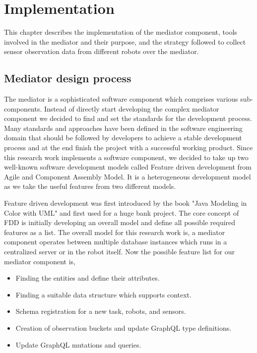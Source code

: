 

	\let\cleardoublepage\clearpage
\chapter{Implementation} \label{sec:implementation}
This chapter describes the implementation of the mediator component, tools involved in the mediator and their purpose, and the strategy followed to collect sensor observation data from different robots over the mediator. 

	\section{Mediator design process}
	 The mediator is a sophisticated software component which comprises various sub-components. Instead of directly start developing the complex mediator component we decided to find and set the standards for the development process. Many standards and approaches have been defined in the software engineering domain that should be followed by developers to achieve a stable development process and at the end finish the project with a successful working product. Since this research work implements a software component, we decided to take up two well-known software development models called Feature driven development from Agile and Component Assembly Model. It is a heterogeneous development model as we take the useful features from two different models.
	
	Feature driven development was first introduced by the book "Java Modeling in Color with UML" \cite{misc15} and first used for a huge bank project. The core concept of FDD is initially developing an overall model and define all possible required features as a list. The overall model for this research work is, a mediator component operates between multiple database instances which runs in a centralized server or in the robot itself. Now the possible feature list for our mediator component is, 
	
	\begin{itemize}
		\item Finding the entities and define their attributes.
		\item Finding a suitable data structure which supports context.
		\item Schema registration for a new task, robots, and sensors.
		\item Creation of observation buckets and update GraphQL type definitions.
		\item Update GraphQL mutations and queries.
	\end{itemize}
	
